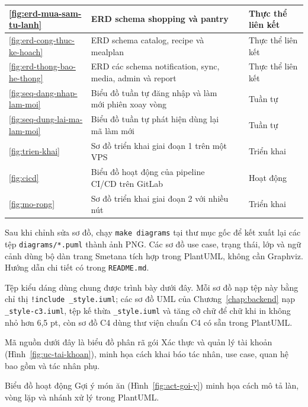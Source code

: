 {\begin{longtable}{|C{1.3cm}|L{\dimexpr{}\arrayrulewidth-1.3cm-5.6cm-2.4cm\relax}|L{5.6cm}|L{2.4cm}|}
\ref{fig:erd-mua-sam-tu-lanh} & ERD schema shopping và pantry &  & Thực thể liên kết\\ \hline
\ref{fig:erd-cong-thuc-ke-hoach} & ERD schema catalog, recipe và mealplan &  & Thực thể liên kết\\ \hline
\ref{fig:erd-thong-bao-he-thong} & ERD các schema notification, sync, media, admin và report &  & Thực thể liên kết\\ \hline
\ref{fig:seq-dang-nhap-lam-moi} & Biểu đồ tuần tự đăng nhập và làm mới phiên xoay vòng &  & Tuần tự\\ \hline
\ref{fig:seq-dung-lai-ma-lam-moi} & Biểu đồ tuần tự phát hiện dùng lại mã làm mới &  & Tuần tự\\ \hline
\ref{fig:trien-khai} & Sơ đồ triển khai giai đoạn 1 trên một VPS &  & Triển khai\\ \hline
\ref{fig:cicd} & Biểu đồ hoạt động của pipeline CI/CD trên GitLab &  & Hoạt động\\ \hline
\ref{fig:mo-rong} & Sơ đồ triển khai giai đoạn 2 với nhiều nút &  & Triển khai\\ \hline
\end{longtable}
}

Sau khi chỉnh sửa sơ đồ, chạy \texttt{make diagrams} tại thư mục gốc để kết xuất lại các tệp \texttt{diagrams/*.puml} thành ảnh PNG. Các sơ đồ use case, trạng thái, lớp và ngữ cảnh dùng bộ dàn trang Smetana tích hợp trong PlantUML, không cần Graphviz. Hướng dẫn chi tiết có trong \texttt{README.md}.

Tệp kiểu dáng dùng chung được trình bày dưới đây. Mỗi sơ đồ nạp tệp này bằng chỉ thị \texttt{!include \_style.iuml}; các sơ đồ UML của Chương~\ref{chap:backend} nạp \texttt{\_style-c3.iuml}, tệp kế thừa \texttt{\_style.iuml} và tăng cỡ chữ để chữ khi in không nhỏ hơn 6,5 pt, còn sơ đồ C4 dùng thư viện chuẩn C4 có sẵn trong PlantUML.


Mã nguồn dưới đây là biểu đồ phân rã gói Xác thực và quản lý tài khoản (Hình~\ref{fig:uc-tai-khoan}), minh họa cách khai báo tác nhân, use case, quan hệ bao gồm và tác nhân phụ.


Biểu đồ hoạt động Gợi ý món ăn (Hình~\ref{fig:act-goi-y}) minh họa cách mô tả làn, vòng lặp và nhánh xử lý trong PlantUML.

